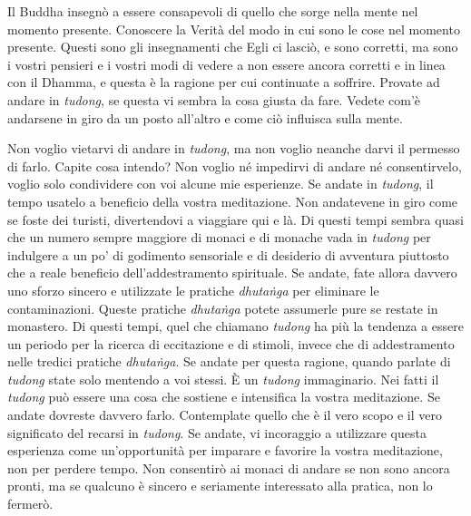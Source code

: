 Il Buddha insegnò a essere consapevoli di quello che sorge nella mente
nel momento presente. Conoscere la Verità del modo in cui sono le cose
nel momento presente. Questi sono gli insegnamenti che Egli ci lasciò, e
sono corretti, ma sono i vostri pensieri e i vostri modi di vedere a non
essere ancora corretti e in linea con il Dhamma, e questa è la ragione
per cui continuate a soffrire. Provate ad andare in \emph{tudong}, se
questa vi sembra la cosa giusta da fare. Vedete com'è andarsene in giro
da un posto all'altro e come ciò influisca sulla mente.

Non voglio vietarvi di andare in \emph{tudong}, ma non voglio neanche
darvi il permesso di farlo. Capite cosa intendo? Non voglio né impedirvi
di andare né consentirvelo, voglio solo condividere con voi alcune mie
esperienze. Se andate in \emph{tudong}, il tempo usatelo a beneficio
della vostra meditazione. Non andatevene in giro come se foste dei
turisti, divertendovi a viaggiare qui e là. Di questi tempi sembra quasi
che un numero sempre maggiore di monaci e di monache vada in
\emph{tudong} per indulgere a un po' di godimento sensoriale e di
desiderio di avventura piuttosto che a reale beneficio
dell'addestramento spirituale. Se andate, fate allora davvero uno sforzo
sincero e utilizzate le pratiche \emph{dhutaṅga} per eliminare le
contaminazioni. Queste pratiche \emph{dhutaṅga} potete assumerle pure se
restate in monastero. Di questi tempi, quel che chiamano \emph{tudong}
ha più la tendenza a essere un periodo per la ricerca di eccitazione e
di stimoli, invece che di addestramento nelle tredici pratiche
\emph{dhutaṅga}. Se andate per questa ragione, quando parlate di
\emph{tudong} state solo mentendo a voi stessi. È un \emph{tudong}
immaginario. Nei fatti il \emph{tudong} può essere una cosa che sostiene
e intensifica la vostra meditazione. Se andate dovreste davvero farlo.
Contemplate quello che è il vero scopo e il vero significato del recarsi
in \emph{tudong}. Se andate, vi incoraggio a utilizzare questa
esperienza come un'opportunità per imparare e favorire la vostra
meditazione, non per perdere tempo. Non consentirò ai monaci di andare
se non sono ancora pronti, ma se qualcuno è sincero e seriamente
interessato alla pratica, non lo fermerò.

